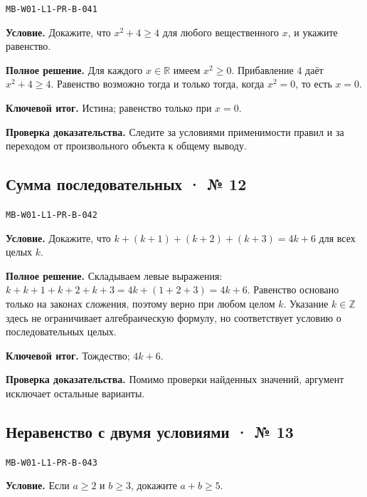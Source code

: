 \documentclass[11pt,a4paper,openany]{book}
\newcommand{\muid}[1]{\texttt{\footnotesize #1}}
\begin{document}
\muid{MB-W01-L1-PR-B-041}\par

\textbf{Условие.} Докажите, что $x^2+4\ge4$ для любого вещественного $x$, и укажите равенство.\par

\textbf{Полное решение.} Для каждого $x\in\mathbb R$ имеем $x^2\ge0$. Прибавление $4$ даёт $x^2+4\ge4$. Равенство возможно тогда и только тогда, когда $x^2=0$, то есть $x=0$.


\begin{learnbox}\textbf{Ключевой итог.} Истина; равенство только при $x=0$.\par \textbf{Проверка доказательства.} 
Следите за условиями применимости правил и за переходом от произвольного объекта к общему выводу. 
\end{learnbox}

\subsection*{Сумма последовательных · № 12}\hypertarget{solution:MB-W01-L1-PR-B-042}{}

\muid{MB-W01-L1-PR-B-042}\par

\textbf{Условие.} Докажите, что $k+(k+1)+(k+2)+(k+3)=4k+6$ для всех целых $k$.\par

\textbf{Полное решение.} Складываем левые выражения: $k+k+1+k+2+k+3=4k+(1+2+3)=4k+6$. Равенство основано только на законах сложения, поэтому верно при любом целом $k$. Указание $k\in\mathbb Z$ здесь не ограничивает алгебраическую формулу, но соответствует условию о последовательных целых.


\begin{learnbox}\textbf{Ключевой итог.} Тождество; $4k+6$.\par \textbf{Проверка доказательства.} 
Помимо проверки найденных значений, аргумент исключает остальные варианты. 
\end{learnbox}

\subsection*{Неравенство с двумя условиями · № 13}\hypertarget{solution:MB-W01-L1-PR-B-043}{}

\muid{MB-W01-L1-PR-B-043}\par

\textbf{Условие.} Если $a\ge2$ и $b\ge3$, докажите $a+b\ge5$.\par
\end{document}
